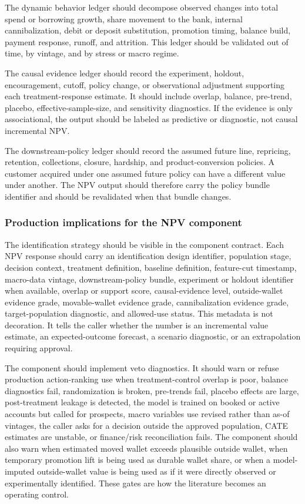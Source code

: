 \documentclass[11pt]{article}
\newcommand{\1}{\mathbf{1}}
\begin{document}
The dynamic behavior ledger should decompose observed changes into total spend
or borrowing growth, share movement to the bank, internal cannibalization,
debit or deposit substitution, promotion timing, balance build, payment
response, runoff, and attrition. This ledger should be validated out of time,
by vintage, and by stress or macro regime.

The causal evidence ledger should record the experiment, holdout,
encouragement, cutoff, policy change, or observational adjustment supporting
each treatment-response estimate. It should include overlap, balance,
pre-trend, placebo, effective-sample-size, and sensitivity diagnostics. If the
evidence is only associational, the output should be labeled as predictive or
diagnostic, not causal incremental NPV.

The downstream-policy ledger should record the assumed future line,
repricing, retention, collections, closure, hardship, and product-conversion
policies. A customer acquired under one assumed future policy can have a
different value under another. The NPV output should therefore carry the policy
bundle identifier and should be revalidated when that bundle changes.

\subsubsection{Production implications for the NPV component}

The identification strategy should be visible in the component contract. Each
NPV response should carry an identification design identifier, population
stage, decision context, treatment definition, baseline definition, feature-cut
timestamp, macro-data vintage, downstream-policy bundle, experiment or holdout
identifier when available, overlap or support score, causal-evidence level,
outside-wallet evidence grade, movable-wallet evidence grade, cannibalization
evidence grade, target-population diagnostic, and allowed-use status. This
metadata is not decoration. It tells the caller whether the number is an
incremental value estimate, an expected-outcome forecast, a scenario diagnostic,
or an extrapolation requiring approval.

The component should implement veto diagnostics. It should warn or refuse
production action-ranking use when treatment-control overlap is poor, balance
diagnostics fail, randomization is broken, pre-trends fail, placebo effects are
large, post-treatment leakage is detected, the model is trained on booked or
active accounts but called for prospects, macro variables use revised rather
than as-of vintages, the caller asks for a decision outside the approved
population, CATE estimates are unstable, or finance/risk reconciliation fails.
The component should also warn when estimated moved wallet exceeds plausible
outside wallet, when temporary promotion lift is being used as durable wallet
share, or when a model-imputed outside-wallet value is being used as if it were
directly observed or experimentally identified. These gates are how the
literature becomes an operating control.
\end{document}
